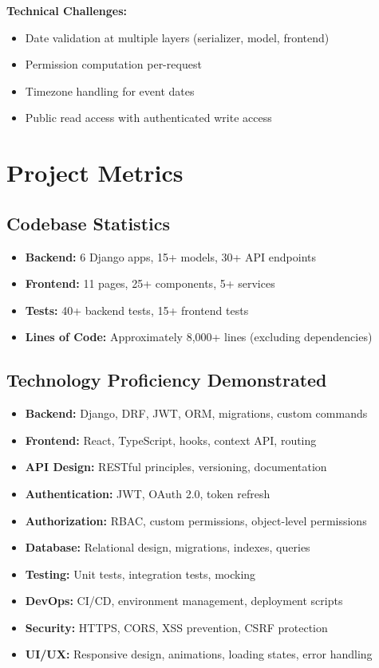 \documentclass[11pt,a4paper]{article}
\begin{document}
\textbf{Technical Challenges:}
\begin{itemize}[leftmargin=*]
    \item Date validation at multiple layers (serializer, model, frontend)
    \item Permission computation per-request
    \item Timezone handling for event dates
    \item Public read access with authenticated write access
\end{itemize}

\section{Project Metrics}

\subsection{Codebase Statistics}
\begin{itemize}[leftmargin=*]
    \item \textbf{Backend:} 6 Django apps, 15+ models, 30+ API endpoints
    \item \textbf{Frontend:} 11 pages, 25+ components, 5+ services
    \item \textbf{Tests:} 40+ backend tests, 15+ frontend tests
    \item \textbf{Lines of Code:} Approximately 8,000+ lines (excluding dependencies)
\end{itemize}

\subsection{Technology Proficiency Demonstrated}
\begin{itemize}[leftmargin=*]
    \item \textbf{Backend:} Django, DRF, JWT, ORM, migrations, custom commands
    \item \textbf{Frontend:} React, TypeScript, hooks, context API, routing
    \item \textbf{API Design:} RESTful principles, versioning, documentation
    \item \textbf{Authentication:} JWT, OAuth 2.0, token refresh
    \item \textbf{Authorization:} RBAC, custom permissions, object-level permissions
    \item \textbf{Database:} Relational design, migrations, indexes, queries
    \item \textbf{Testing:} Unit tests, integration tests, mocking
    \item \textbf{DevOps:} CI/CD, environment management, deployment scripts
    \item \textbf{Security:} HTTPS, CORS, XSS prevention, CSRF protection
    \item \textbf{UI/UX:} Responsive design, animations, loading states, error handling
\end{itemize}
\end{document}
